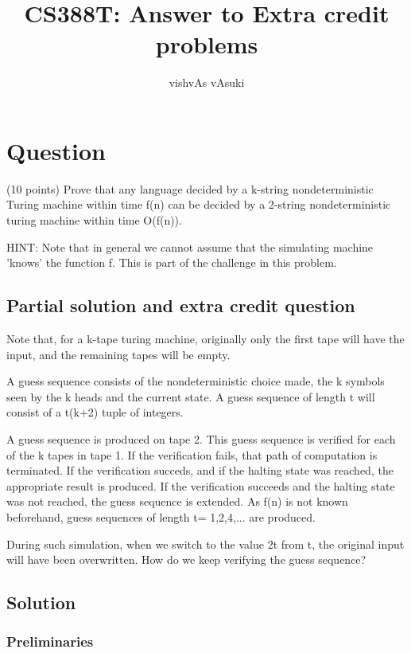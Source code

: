 \documentclass[10pt]{amsart}
\title{CS388T: Answer to Extra credit problems}
\author{vishvAs vAsuki}
\theoremstyle{remark}
\begin{document}
\maketitle

\section{Question}
(10 points) Prove that any language decided by a k-string nondeterministic Turing machine within time f(n) can be decided by a 2-string nondeterministic turing machine within time O(f(n)).

HINT: Note that in general we cannot assume that the simulating machine 'knows' the function f. This is part of the challenge in this problem.

\subsection{Partial solution and extra credit question}

Note that, for a k-tape turing machine, originally only the first tape will have the input, and the remaining tapes will be empty.

A guess sequence consists of the nondeterministic choice made, the k symbols seen by the k heads and the current state. A guess sequence of length t will consist of a t(k+2) tuple of integers.

A guess sequence is produced on tape 2. This guess sequence is verified for each of the k tapes in tape 1. If the verification fails, that path of computation is terminated. If the verification succeds, and if the halting state was reached, the appropriate result is produced. If the verification succeeds and the halting state was not reached, the guess sequence is extended. As f(n) is not known beforehand, guess sequences of length t= 1,2,4,... are produced.

During such simulation, when we switch to the value 2t from t, the original input will have been overwritten. How do we keep verifying the guess sequence?

\subsection{Solution}

\subsubsection{Preliminaries}
\end{document}
